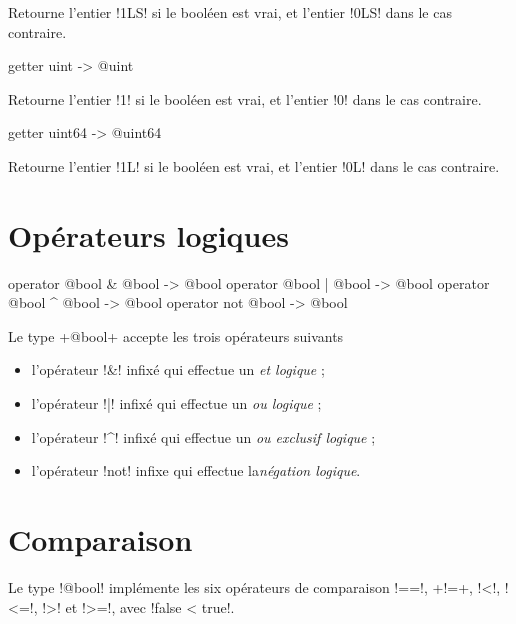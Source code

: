 Retourne l'entier \ggs!1LS! si le booléen est vrai, et l'entier \ggs!0LS! dans le cas contraire.





\begin{galgasbox}
getter uint -> @uint
\end{galgasbox}

Retourne l'entier \ggs!1! si le booléen est vrai, et l'entier \ggs!0! dans le cas contraire.





\begin{galgasbox}
getter uint64 -> @uint64
\end{galgasbox}

Retourne l'entier \ggs!1L! si le booléen est vrai, et l'entier \ggs!0L! dans le cas contraire.




\section{Opérateurs logiques}

\begin{galgasbox}
operator @bool & @bool -> @bool
operator @bool | @bool -> @bool
operator @bool ^ @bool -> @bool
operator not @bool -> @bool
\end{galgasbox}

Le type \ggs+@bool+ accepte les trois opérateurs suivants
\begin{itemize}
\item l'opérateur \ggs!&! infixé qui effectue un \emph{et logique} ;
\item l'opérateur \ggs!|! infixé qui effectue un \emph{ou logique} ;
\item l'opérateur \ggs!^! infixé qui effectue un \emph{ou exclusif logique} ;
\item l'opérateur \ggs!not! infixe qui effectue la\emph{négation logique}.
\end{itemize}








\section{Comparaison}

Le type \ggs!@bool! implémente les six opérateurs de comparaison \ggs!==!, \ggs+!=+, \ggs!<!, \ggs!<=!, \ggs!>! et \ggs!>=!, avec \ggs!false < true!.
